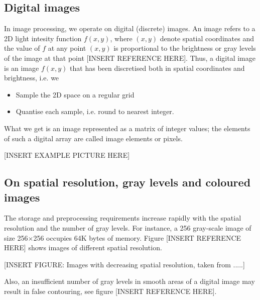 \subsection{Digital images}

In image processing, we operate on digital (discrete) images.
An image refers to a 2D light intesity function \( f(x,y) \), where \( (x,y) \) denote spatial coordinates and the value of \( f \) at any point \( (x,y) \) is proportional to the brightness or gray levels of the image at that point [INSERT REFERENCE HERE].
Thus, a digital image is an image \( f(x,y)  \) that has been discretised both in spatial coordinates and brightness, i.e. we

\begin{itemize}
	\item Sample the 2D space on a regular grid
	\item Quantise each sample, i.e. round to nearest integer.
\end{itemize}

What we get is an image represented as a matrix of integer values; the elements of such a digital array are called image elements or pixels.


[INSERT EXAMPLE PICTURE HERE]


\subsection{On spatial resolution, gray levels and coloured images}

The storage and preprocessing requirements increase rapidly with the spatial resolution and the number of gray levels. 
For instance, a 256 gray-scale image of size 256\( \times \)256 occupies 64K bytes of memory. Figure [INSERT REFERENCE HERE] shows images of different spatial resolution. 

[INSERT FIGURE: Images with decreasing spatial resolution, taken from .....]

Also, an insufficient number of gray levels in smooth areas of a digital image may result in false contouring, see figure [INSERT REFERENCE HERE].

